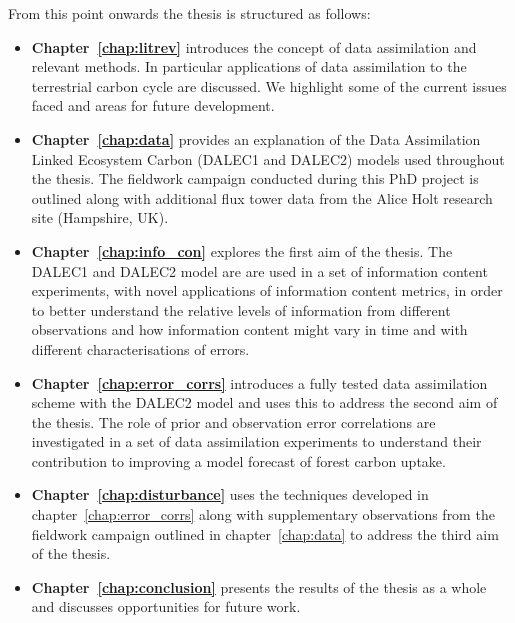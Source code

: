 From this point onwards the thesis is structured as follows:

\begin{itemize}
\item \textbf{Chapter~\ref{chap:litrev}} introduces the concept of data assimilation and relevant methods. In particular applications of data assimilation to the terrestrial carbon cycle are discussed. We highlight some of the current issues faced and areas for future development.  

\item \textbf{Chapter~\ref{chap:data}} provides an explanation of the Data Assimilation Linked Ecosystem Carbon (DALEC1 and DALEC2) models used throughout the thesis. The fieldwork campaign conducted during this PhD project is outlined along with additional flux tower data from the Alice Holt research site (Hampshire, UK).

\item \textbf{Chapter~\ref{chap:info_con}} explores the first aim of the thesis. The DALEC1 and DALEC2 model are are used in a set of information content experiments, with novel applications of information content metrics, in order to better understand the relative levels of information from different observations and how information content might vary in time and with different characterisations of errors.

\item \textbf{Chapter~\ref{chap:error_corrs}} introduces a fully tested data assimilation scheme with the DALEC2 model and uses this to address the second aim of the thesis. The role of prior and observation error correlations are investigated in a set of data assimilation experiments to understand their contribution to improving a model forecast of forest carbon uptake.

\item \textbf{Chapter~\ref{chap:disturbance}} uses the techniques developed in chapter~\ref{chap:error_corrs} along with supplementary observations from the fieldwork campaign outlined in chapter~\ref{chap:data} to address the third aim of the thesis.

\item \textbf{Chapter~\ref{chap:conclusion}} presents the results of the thesis as a whole and discusses opportunities for future work.    

\end{itemize}

